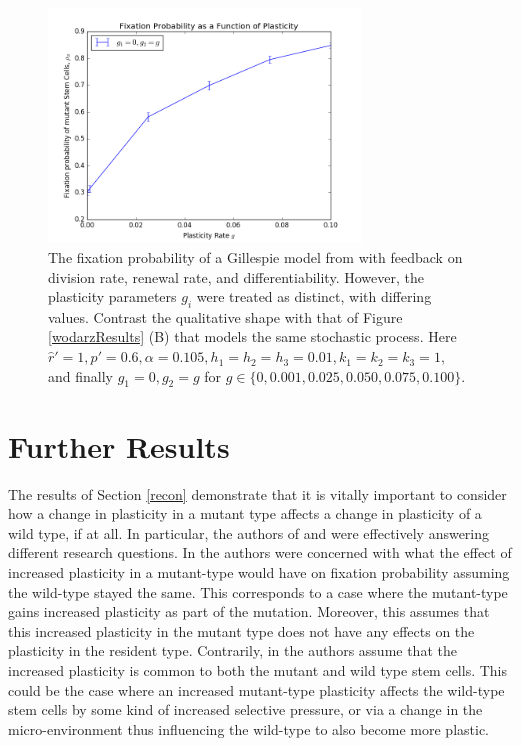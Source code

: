 \documentclass[12pt]{article}
\begin{document}
\begin{figure}[H]
\begin{center}
\includegraphics[width=0.74\textwidth]{gill_fix.png}
\end{center}
\caption{The fixation probability of a Gillespie model from \cite{wodarz} with feedback on division rate, renewal rate, and differentiability. However, the plasticity parameters $g_i$ were treated as distinct, with differing values. Contrast the qualitative shape with that of Figure \ref{wodarzResults} (B) that models the same stochastic process. Here $\hat{r}'=1, p'=0.6, \alpha=0.105, h_1=h_2=h_3=0.01, k_1=k_2=k_3=1,$ and finally $g_1=0, g_2=g$ for $g\in\{0,0.001,0.025,0.050,0.075,0.100\}$.}\label{GillFix}
\end{figure}

\section{Further Results}
The results of Section \ref{recon} demonstrate that it is vitally important to consider how a change in plasticity in a mutant type affects a change in plasticity of a wild type, if at all.
In particular, the authors of \cite{mohammad} and \cite{wodarz} were effectively answering different research questions. In \cite{mohammad} the authors were concerned with what the effect of increased plasticity in a mutant-type would have on fixation probability assuming the wild-type stayed the same. This corresponds to a case where the mutant-type gains increased plasticity as part of the mutation. Moreover, this assumes that this increased plasticity in the mutant type does not have any effects on the plasticity in the resident type. Contrarily, in \cite{wodarz} the authors assume that the increased plasticity is common to both the mutant and wild type stem cells. This could be the case where an increased mutant-type plasticity affects the wild-type stem cells by some kind of increased selective pressure, or via a change in the micro-environment thus influencing the wild-type to also become more plastic.
\end{document}
